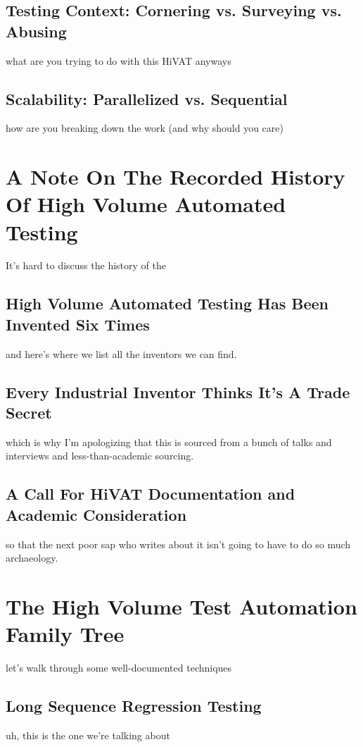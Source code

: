 \subsection{Testing Context: Cornering vs. Surveying vs. Abusing}
what are you trying to do with this HiVAT anyways %

\subsection{Scalability: Parallelized vs. Sequential}
how are you breaking down the work (and why should you care) %


\section{A Note On The Recorded History Of High Volume Automated Testing}
It's hard to discuss the history of the

\subsection{High Volume Automated Testing Has Been Invented Six Times}
and here's where we list all the inventors we can find.
\citep{miller1990empirical, KanerHivatOverview} %

\subsection{Every Industrial Inventor Thinks It's A Trade Secret}
which is why I'm apologizing that this is sourced from a bunch of talks and interviews and less-than-academic sourcing. %

\subsection{A Call For HiVAT Documentation and Academic Consideration}
so that the next poor sap who writes about it isn't going to have to do so much archaeology. %

\section{The High Volume Test Automation Family Tree}
let's walk through some well-documented techniques %

\subsection{Long Sequence Regression Testing}
uh, this is the one we're talking about \citep{lee1996principles} %

